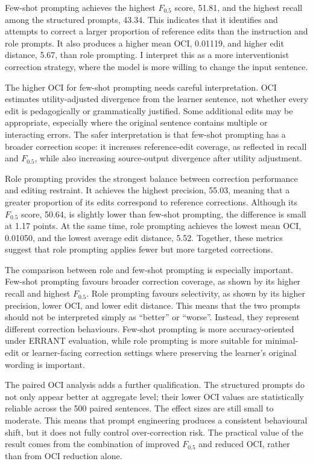 Few-shot prompting achieves the highest $F_{0.5}$ score, 51.81, and the highest recall among the structured prompts, 43.34. This indicates that it identifies and attempts to correct a larger proportion of reference edits than the instruction and role prompts. It also produces a higher mean OCI, 0.01119, and higher edit distance, 5.67, than role prompting. I interpret this as a more interventionist correction strategy, where the model is more willing to change the input sentence.

The higher OCI for few-shot prompting needs careful interpretation. OCI estimates utility-adjusted divergence from the learner sentence, not whether every edit is pedagogically or grammatically justified. Some additional edits may be appropriate, especially where the original sentence contains multiple or interacting errors. The safer interpretation is that few-shot prompting has a broader correction scope: it increases reference-edit coverage, as reflected in recall and $F_{0.5}$, while also increasing source-output divergence after utility adjustment.

Role prompting provides the strongest balance between correction performance and editing restraint. It achieves the highest precision, 55.03, meaning that a greater proportion of its edits correspond to reference corrections. Although its $F_{0.5}$ score, 50.64, is slightly lower than few-shot prompting, the difference is small at 1.17 points. At the same time, role prompting achieves the lowest mean OCI, 0.01050, and the lowest average edit distance, 5.52. Together, these metrics suggest that role prompting applies fewer but more targeted corrections.

The comparison between role and few-shot prompting is especially important. Few-shot prompting favours broader correction coverage, as shown by its higher recall and highest $F_{0.5}$. Role prompting favours selectivity, as shown by its higher precision, lower OCI, and lower edit distance. This means that the two prompts should not be interpreted simply as ``better'' or ``worse''. Instead, they represent different correction behaviours. Few-shot prompting is more accuracy-oriented under ERRANT evaluation, while role prompting is more suitable for minimal-edit or learner-facing correction settings where preserving the learner's original wording is important.

The paired OCI analysis adds a further qualification. The structured prompts do not only appear better at aggregate level; their lower OCI values are statistically reliable across the 500 paired sentences. The effect sizes are still small to moderate. This means that prompt engineering produces a consistent behavioural shift, but it does not fully control over-correction risk. The practical value of the result comes from the combination of improved $F_{0.5}$ and reduced OCI, rather than from OCI reduction alone.

